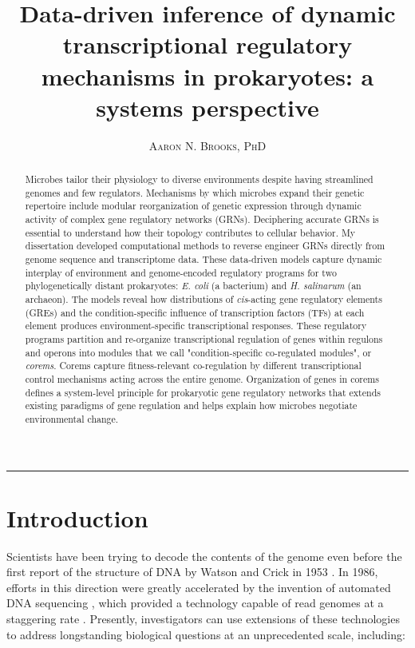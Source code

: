 \documentclass{article}
\title{\vspace{-15mm}\fontsize{20pt}{10pt}\selectfont\textbf{Data-driven inference of dynamic transcriptional regulatory mechanisms in prokaryotes: a systems perspective}} %
\author{
\large
{\textsc{ Aaron N. Brooks, PhD }}
}
\date{}
\begin{document}
\sansmath
\maketitle %
\thispagestyle{fancy} %

\vspace{-5mm}\rule{\textwidth}{1pt}

\begin{abstract}
\noindent Microbes tailor their physiology to diverse environments despite having streamlined genomes and few regulators. Mechanisms by which microbes expand their genetic repertoire include modular reorganization of genetic expression through dynamic activity of complex gene regulatory networks (GRNs). Deciphering accurate GRNs is essential to understand how their topology contributes to cellular behavior. My dissertation developed computational methods to reverse engineer GRNs directly from genome sequence and transcriptome data. These data-driven models capture dynamic interplay of environment and genome-encoded regulatory programs for two phylogenetically distant prokaryotes: \textit{E. coli} (a bacterium) and \textit{H. salinarum} (an archaeon). The models reveal how distributions of \textit{cis}-acting gene regulatory elements (GREs) and the condition-specific influence of transcription factors (TFs) at each element produces environment-specific transcriptional responses. These regulatory programs partition and re-organize transcriptional regulation of genes within regulons and operons into modules that we call "condition-specific co-regulated modules", or \textit{corems}. Corems capture fitness-relevant co-regulation by different transcriptional control mechanisms acting across the entire genome. Organization of genes in corems defines a system-level principle for prokaryotic gene regulatory networks that extends existing paradigms of gene regulation and helps explain how microbes negotiate environmental change.
\end{abstract}

\section{Introduction}

Scientists have been trying to decode the contents of the genome even before the first report of the structure of DNA by Watson and Crick in 1953 \cite{watson_molecular_1953}. In 1986, efforts in this direction were greatly accelerated by the invention of automated DNA sequencing \cite{smith_fluorescence_1986}, which provided a technology capable of read genomes at a staggering rate \cite{check_hayden_technology:_2014}. Presently, investigators can use extensions of these technologies to address longstanding biological questions at an unprecedented scale, including: 
\end{document}
